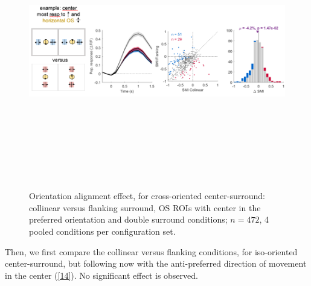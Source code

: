 \begin{figure}[H] \centering \includegraphics[width=12cm,height=12cm,keepaspectratio]{Figures/7.Results/finalPopulation/sel/diagrams/13.png} 
\caption{Orientation alignment effect, for cross-oriented center-surround: collinear versus flanking surround, OS ROIs with center in the preferred orientation and double surround conditions;  $n=472$, 4 pooled conditions per configuration set.} \label{13} 
\end{figure}

Then, we first compare the collinear versus flanking conditions, for iso-oriented center-surround, but following now with the anti-preferred direction of movement in the center (\ref{14}). No significant effect is observed.

